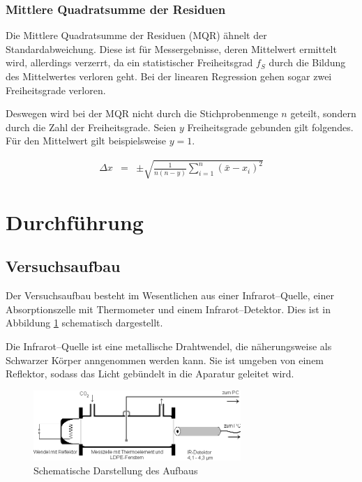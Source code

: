 \documentclass[12pt,a4paper]{scrartcl}
\numberwithin{equation}{section} %
\begin{document}
\hypertarget{mittlere-quadratsumme-der-residuen}{%
\subsubsection{Mittlere Quadratsumme der Residuen}\label{mittlere-quadratsumme-der-residuen}}

Die Mittlere Quadratsumme der Residuen (MQR) ähnelt der Standardabweichung. Diese ist für Messergebnisse, deren Mittelwert ermittelt wird, allerdings verzerrt, da ein statistischer Freiheitsgrad $f_S$ durch die Bildung des Mittelwertes verloren geht. Bei der linearen Regression gehen sogar zwei Freiheitsgrade verloren.

Deswegen wird bei der MQR nicht durch die Stichprobenmenge $n$ geteilt, sondern durch die Zahl der Freiheitsgrade. Seien $y$ Freiheitsgrade gebunden gilt folgendes. Für den Mittelwert gilt beispielsweise $y=1$.

\begin{eqnarray}
    \Delta x &=& \pm\sqrt{\frac{1}{n(n - y)}\sum_{i=1}^n(\bar{x}-x_i)^2}
\end{eqnarray}

\clearpage
\hypertarget{durchfuxfchrung}{%
\section{Durchführung}\label{durchfuxfchrung}}
\subsection{Versuchsaufbau}
\label{Versuchsaufbau}

Der Versuchsaufbau besteht im Wesentlichen aus einer Infrarot--Quelle, einer Absorptionszelle mit Thermometer und einem Infrarot--Detektor. Dies ist in Abbildung \ref{abb:Aufbau} schematisch dargestellt.

Die Infrarot--Quelle ist eine metallische Drahtwendel, die näherungsweise als Schwarzer Körper anngenommen werden kann. Sie ist umgeben von einem Reflektor, sodass das Licht gebündelt in die Aparatur geleitet wird.

\begin{figure}[h!]
	\centering
	\includegraphics[width=0.7\textwidth]{../media/B1.1/IR_Aufbau.png}
	\caption{Schematische Darstellung des Aufbaus \cite{UzK}}
	\label{abb:Aufbau}
\end{figure}
\end{document}
